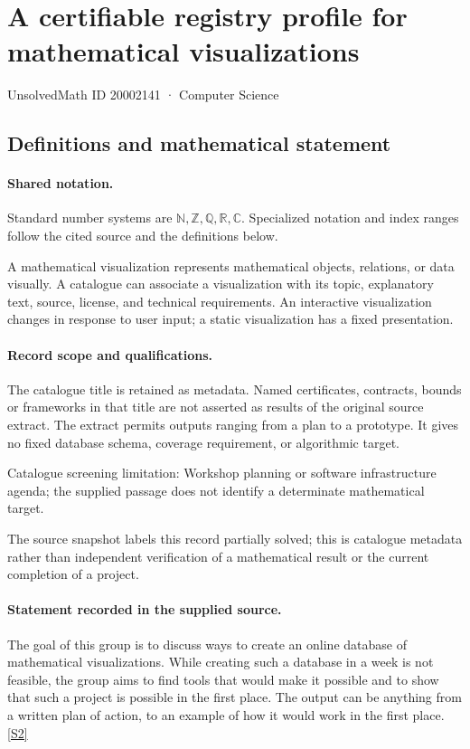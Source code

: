 \documentclass[11pt]{article}
\newcommand{\sref}[2]{\hyperlink{source:#1:#2}{[S#2]}}
\begin{document}
\setcounter{section}{20002140}
\section{A certifiable registry profile for mathematical visualizations}\label{20002141}
{\small\sffamily UnsolvedMath ID 20002141 · Computer Science}
\subsection{Definitions and mathematical statement}

\paragraph{Shared notation.}Standard number systems are $\mathbb N,\mathbb Z,\mathbb Q,\mathbb R,\mathbb C$. Specialized notation and index ranges follow the cited source and the definitions below.


A mathematical visualization represents mathematical objects, relations, or data visually. A catalogue can associate a visualization with its topic, explanatory text, source, license, and technical requirements. An interactive visualization changes in response to user input; a static visualization has a fixed presentation.
\paragraph{Record scope and qualifications.}
The catalogue title is retained as metadata. Named certificates, contracts, bounds or frameworks in that title are not asserted as results of the original source extract.
The extract permits outputs ranging from a plan to a prototype. It gives no fixed database schema, coverage requirement, or algorithmic target.

Catalogue screening limitation: Workshop planning or software infrastructure agenda; the supplied passage does not identify a determinate mathematical target.

The source snapshot labels this record partially solved; this is catalogue metadata rather than independent verification of a mathematical result or the current completion of a project.
\paragraph{Statement recorded in the supplied source.}
The goal of this group is to discuss ways to create an online database of mathematical visualizations. While creating such a database in a week is not feasible, the group aims to find tools that would make it possible and to show that such a project is possible in the first place. The output can be anything from a written plan of action, to an example of how it would work in the first place. \sref{20002141}{2}
\end{document}
